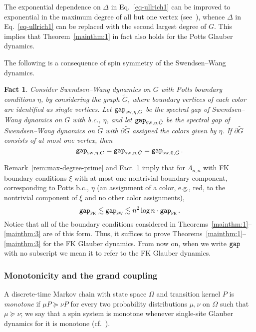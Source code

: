 \documentclass[reqno,11pt]{amsart}
\numberwithin{equation}{section}
\newtheorem{fact}[theorem]{Fact}
\theoremstyle{definition}{
\newtheorem{example}[theorem]{Example}
\newtheorem{definition}[theorem]{Definition}
\newtheorem*{definition*}{Definition}
\newtheorem{problem}[theorem]{Problem}
\newtheorem{question}[theorem]{Question}
\newtheorem{remark}[theorem]{Remark}
}
\newcommand{\gap}{\text{\tt{gap}}}
\newcommand{\rc}{{\textsc{fk}}}
\begin{document}
\begin{remark}\label{rem:max-degree-prime}
The exponential dependence on $\Delta$ in Eq.~\eqref{eq-ullrich1} can be improved to exponential in the maximum degree of all but one vertex (see~\cite[Theorem~1']{Ul13}), whence $\Delta$ in Eq.~\eqref{eq-ullrich1} can be replaced with the second largest degree of $G$. This implies that Theorem~\ref{mainthm:1} in fact also holds for the Potts Glauber dynamics.
\end{remark}

The following is a consequence of spin symmetry of the Swendsen--Wang dynamics. 

\begin{fact}\label{fact:one-color}
Consider  Swendsen--Wang dynamics on $G$ with Potts boundary conditions $\eta$, by considering the graph $\tilde G$, where boundary vertices of each color are identified as single vertices. Let $\gap_{\textsc{sw},\eta,G}$ be the spectral gap of Swendsen--Wang dynamics on $G$ with b.c., $\eta$, and let $\gap_{\textsc{sw},\eta,\tilde G}$  be the spectral gap of Swendsen--Wang dynamics on $\tilde G$ with $\partial \tilde G$ assigned the colors given by $\eta$. If $\partial \tilde G$ consists of at most one vertex, then
\[\gap_{\textsc{sw},\eta,G}=\gap_{\textsc{sw},\eta,\tilde G}=\gap_{\textsc{sw},0,\tilde G}\,.
\]
\end{fact}

Remark~\ref{rem:max-degree-prime} and Fact~\ref{fact:one-color} imply that for $\Lambda_{n,n}$ with FK boundary conditions $\xi$ with at most one nontrivial boundary component, corresponding to Potts b.c., $\eta$ (an assignment of a color, e.g., red, to the nontrivial component of $\xi$ and no other color assignments),
\[\gap_{\rc} \lesssim\gap_{\textsc{sw}}\lesssim n^2 \log n \cdot \gap_{\rc}\,.
\]
Notice that all of the boundary conditions considered in Theorems~\ref{mainthm:1}--\ref{mainthm:3} are of this form. Thus, it suffices to prove Theorems~\ref{mainthm:1}--\ref{mainthm:3} for the FK Glauber dynamics. From now on, when we write $\gap$ with no subscript we mean it to refer to the FK Glauber dynamics. 

\subsubsection*{Monotonicity and the grand coupling}  %
A discrete-time Markov chain with state space $\Omega$ and transition kernel $P$ is \emph{monotone} if $\mu P \succeq \nu P$ for every two probability distributions $\mu,\nu$ on $\Omega$ such that $\mu \succeq \nu$; we say that a spin system is monotone whenever single-site Glauber dynamics for it is monotone (cf.~\cite[\S22.3]{LPW17}).
\end{document}
